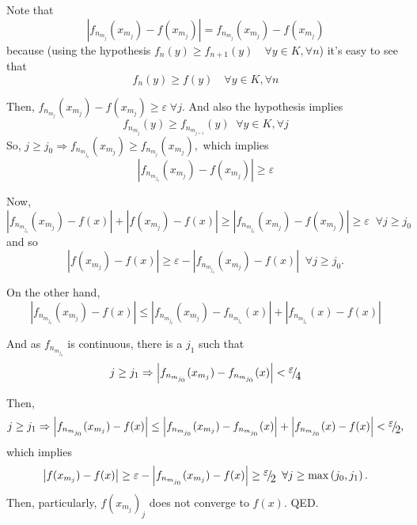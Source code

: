 \documentclass[12pt]{article}
\begin{document}
Note that
\[
\left| {f_{n_{m_j } } (x_{m_j } )-f(x_{m_j } )} \right|=f_{n_{m_j } }
(x_{m_j } )-f(x_{m_j } )
\]
because (using the hypothesis $f_n (y)\ge f_{n+1} (y)\quad \forall y\in K,\forall n$) it's easy to see that 
\[
f_n (y)\ge f(y)\quad \forall y\in K,\forall n
\]

Then, $f_{n_{m_j } } (x_{m_j } )-f(x_{m_j } )\ge \varepsilon \;\forall
j$. And also the hypothesis implies
\[
f_{n_{m_j } } (y)\ge f_{n_{m_{j+1} } } (y)\;\;\forall y\in K,\forall j
\]
So, $j\ge j_0 \Rightarrow f_{n_{m_{j_0 } } } (x_{m_j } )\ge f_{n_{m_j } } (x_{m_j } ),$ which implies
\[
\left| {f_{n_{m_{j_0 } } } (x_{m_j } )-f(x_{m_j } )} \right|\ge \varepsilon
\]

Now,
\[
\left| {f_{n_{m_{j_0 } } } (x_{m_j } )-f(x)} \right|+\left| {f(x_{m_j }
)-f(x)} \right|\ge \left| {f_{n_{m_{j_0 } } } (x_{m_j } )-f(x_{m_j } )}
\right|\ge \varepsilon \;\;\forall j\ge j_0
\]
and so
\[
\left| {f(x_{m_j } )-f(x)} \right|\ge \varepsilon -\left| {f_{n_{m_{j_0 } }
} (x_{m_j } )-f(x)} \right|\;\;\forall j\ge j_0 .
\]

On the other hand,
\[
\left| {f_{n_{m_{j_0 } } } (x_{m_j } )-f(x)} \right|\le \left|
{f_{n_{m_{j_0 } } } (x_{m_j } )-f_{n_{m_{j_0 } } } (x)} \right|+\left|
{f_{n_{m_{j_0 } } } (x)-f(x)} \right|
\]

And as $f_{n_{m_{j_0 } } } $ is continuous, there is a $j_1 $
such that
\[
j\ge j_1 \Rightarrow \left| {f_{n_{m_{j_0 } } } (x_{m_j }
)-f_{n_{m_{j_0 } } } (x)} \right|<\raise0.7ex\hbox{$\varepsilon $}
\!\mathord{\left/ {\vphantom {\varepsilon
4}}\right.\kern-\nulldelimiterspace}\!\lower0.7ex\hbox{$4$}
\]

Then,
\[
j\ge j_1\Rightarrow \left|
{f_{n_{m_{j_0 } } } (x_{m_j } )-f(x)} \right|\le \left| {f_{n_{m_{j_0 } } }
(x_{m_j } )-f_{n_{m_{j_0 } } } (x)} \right|+\left| {f_{n_{m_{j_0 } } }
(x)-f(x)} \right|<\raise0.7ex\hbox{$\varepsilon $} \!\mathord{\left/
{\vphantom {\varepsilon
2}}\right.\kern-\nulldelimiterspace}\!\lower0.7ex\hbox{$2$},\]
which implies
\[
\left| {f(x_{m_j } )-f(x)} \right|\ge \varepsilon -\left| {f_{n_{m_{j_0 } }
} (x_{m_j } )-f(x)} \right|\ge \raise0.7ex\hbox{$\varepsilon $}
\!\mathord{\left/ {\vphantom {\varepsilon
2}}\right.\kern-\nulldelimiterspace}\!\lower0.7ex\hbox{$2$}\;\;\forall j\ge
\max \left( {j_0 ,j_1 } \right).
\] Then, particularly, $f(x_{m_j } )_j $ does not converge to $f(x)$. QED.
\end{document}
